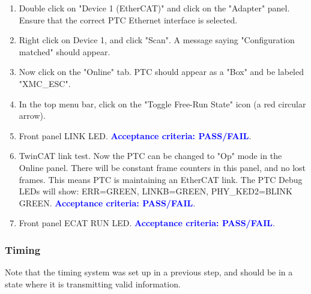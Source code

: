 \documentclass[a4paper,12pt]{article}
\begin{document}
\begin{enumerate}
\begin{enumerate}
            \item Double click on "Device 1 (EtherCAT)" and click on the "Adapter" panel. Ensure that the correct PTC Ethernet interface is selected.
            \item Right click on Device 1, and click "Scan". A message saying "Configuration matched" should appear.
            \item Now click on the "Online" tab. PTC should appear as a "Box" and be labeled "XMC\_ESC".
            \item In the top menu bar, click on the "Toggle Free-Run State" icon (a red circular arrow).
            \item Front panel LINK LED. \textcolor{blue}{\textbf{Acceptance criteria: PASS/FAIL}}.
            \item TwinCAT link test. Now the PTC can be changed to "Op" mode in the Online panel. There will be constant frame counters in this panel, and no lost frames. This means PTC is maintaining an EtherCAT link. The PTC Debug LEDs will show: ERR=GREEN, LINKB=GREEN, PHY\_KED2=BLINK GREEN. \textcolor{blue}{\textbf{Acceptance criteria: PASS/FAIL}}.
            \item Front panel ECAT RUN LED. \textcolor{blue}{\textbf{Acceptance criteria: PASS/FAIL}}.
        \end{enumerate}
    \end{enumerate}    

\subsubsection{Timing}
\label{section:timing_tests}

Note that the timing system was set up in a previous step, and should be in a state where it is transmitting valid information.
\end{document}
